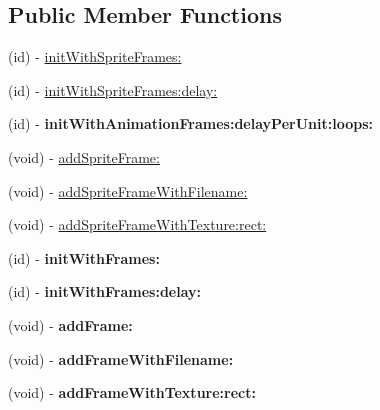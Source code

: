 \subsection*{Public Member Functions}
\begin{DoxyCompactItemize}
\item 
(id) -\/ \hyperlink{interface_c_c_animation_a95564e4e6f4a59abe77b4a0755322551}{init\-With\-Sprite\-Frames\-:}
\item 
(id) -\/ \hyperlink{interface_c_c_animation_a69aa5276c8e74fd41ca9d7bd2b6b3eb0}{init\-With\-Sprite\-Frames\-:delay\-:}
\item 
\hypertarget{interface_c_c_animation_a240cdb3ae3d7dbcd76b05858f104f628}{(id) -\/ {\bfseries init\-With\-Animation\-Frames\-:delay\-Per\-Unit\-:loops\-:}}\label{interface_c_c_animation_a240cdb3ae3d7dbcd76b05858f104f628}

\item 
(void) -\/ \hyperlink{interface_c_c_animation_a6921bb3eb19b8c8abb7c5c2201fb5c7e}{add\-Sprite\-Frame\-:}
\item 
(void) -\/ \hyperlink{interface_c_c_animation_a078c389c687e8065220c16a39f8bd435}{add\-Sprite\-Frame\-With\-Filename\-:}
\item 
(void) -\/ \hyperlink{interface_c_c_animation_a39bcbe7a265dea1e73b0e9124f7e9ab8}{add\-Sprite\-Frame\-With\-Texture\-:rect\-:}
\item 
\hypertarget{interface_c_c_animation_a07f2cc5b80a1793bcb13140e7b211761}{(id) -\/ {\bfseries init\-With\-Frames\-:}}\label{interface_c_c_animation_a07f2cc5b80a1793bcb13140e7b211761}

\item 
\hypertarget{interface_c_c_animation_a8f0ae8d50af5e12541b5e90eedbf8046}{(id) -\/ {\bfseries init\-With\-Frames\-:delay\-:}}\label{interface_c_c_animation_a8f0ae8d50af5e12541b5e90eedbf8046}

\item 
\hypertarget{interface_c_c_animation_ae18c9f2e7fd5d28d843884534de918f5}{(void) -\/ {\bfseries add\-Frame\-:}}\label{interface_c_c_animation_ae18c9f2e7fd5d28d843884534de918f5}

\item 
\hypertarget{interface_c_c_animation_a686b53e474b1c423ca60245e16933636}{(void) -\/ {\bfseries add\-Frame\-With\-Filename\-:}}\label{interface_c_c_animation_a686b53e474b1c423ca60245e16933636}

\item 
\hypertarget{interface_c_c_animation_a9c4027fff657978a6a51c0d5060c9316}{(void) -\/ {\bfseries add\-Frame\-With\-Texture\-:rect\-:}}\label{interface_c_c_animation_a9c4027fff657978a6a51c0d5060c9316}

\end{DoxyCompactItemize}
